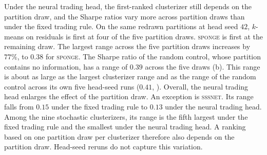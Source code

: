 Under the neural trading head, the first-ranked clusterizer still depends on the partition draw, and the Sharpe ratios vary more across partition draws than under the fixed trading rule. On the same redrawn partitions at head seed $42$, $k$-means on residuals is first at four of the five partition draws. \textsc{sponge} is first at the remaining draw. The largest range across the five partition draws increases by $77\%$, to $0.38$ for \textsc{sponge}. The Sharpe ratio of the random control, whose partition contains no information, has a range of $0.39$ across the five draws (b). This range is about as large as the largest clusterizer range and as the range of the random control across its own five head-seed runs ($0.41$, ). Overall, the neural trading head enlarges the effect of the partition draw. An exception is \textsc{sssnet}. Its range falls from $0.15$ under the fixed trading rule to $0.13$ under the neural trading head. Among the nine stochastic clusterizers, its range is the fifth largest under the fixed trading rule and the smallest under the neural trading head. A ranking based on one partition draw per clusterizer therefore also depends on the partition draw. Head-seed reruns do not capture this variation.

